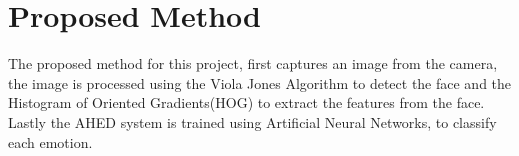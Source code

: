 \section{Proposed Method}

The proposed method for this project, first captures an image from the camera, the image is processed using the Viola Jones Algorithm to detect the face and the Histogram of Oriented Gradients(HOG) to extract the features from the face. Lastly the AHED system is trained using Artificial Neural Networks, to classify each emotion. 


